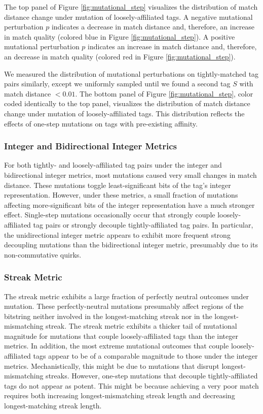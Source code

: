 The top panel of Figure \ref{fig:mutational_step} visualizes the distribution of match distance change under mutation of loosely-affiliated tags.
A negative mutational perturbation $p$ indicates a decrease in match distance and, therefore, an increase in match quality (colored blue in Figure \ref{fig:mutational_step}).
A positive mutational perturbation $p$ indicates an increase in match distance and, therefore, an decrease in match quality (colored red in Figure \ref{fig:mutational_step}).

We measured the distribution of mutational perturbations on tightly-matched tag pairs similarly, except we uniformly sampled until we found a second tag $S$ with match distance $< 0.01$.
The bottom panel of Figure \ref{fig:mutational_step}, color coded identically to the top panel, visualizes the distribution of match distance change under mutation of loosely-affiliated tags.
This distribution reflects the effects of one-step mutations on tags with pre-existing affinity.

\subsubsection{Integer and Bidirectional Integer Metrics}

For both tightly- and loosely-affiliated tag pairs under the integer and bidirectional integer metrics, most mutations caused very small changes in match distance.
These mutations toggle least-significant bits of the tag's integer representation.
However, under these metrics, a small fraction of mutations affecting more-significant bits of the integer representation have a much stronger effect.
Single-step mutations occasionally occur that strongly couple loosely-affiliated tag pairs or strongly decouple tightly-affiliated tag pairs.
In particular, the unidirectional integer metric appears to exhibit more frequent strong decoupling mutations than the bidirectional integer metric, presumably due to its non-commutative quirks.

\subsubsection{Streak Metric}

The streak metric exhibits a large fraction of perfectly neutral outcomes under mutation.
These perfectly-neutral mutations presumably affect regions of the bitstring neither involved in the longest-matching streak nor in the longest-mismatching streak.
The streak metric exhibits a thicker tail of mutational magnitude for mutations that couple loosely-affiliated tags than the integer metrics.
In addition, the most extreme mutational outcomes that couple loosely-affiliated tags appear to be of a comparable magnitude to those under the integer metrics.
Mechanistically, this might be due to mutations that disrupt longest-mismatching streaks.
However, one-step mutations that decouple tightly-affiliated tags do not appear as potent.
This might be because achieving a very poor match requires both increasing longest-mismatching streak length and decreasing longest-matching streak length.

